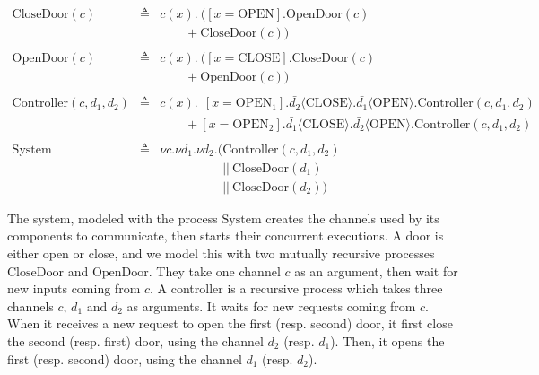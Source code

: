 \begin{example}
  \[
    \begin{array}{rcl}
      \mathrm{CloseDoor}(c)
      & \triangleq
      & c(x) . \ ([x = \mathrm{OPEN}] . \mathrm{OpenDoor}(c) \\
      &
      & \qquad + \mathrm{CloseDoor}(c)) \\
      & & \\
      \mathrm{OpenDoor}(c)
      & \triangleq
      & c(x) . \ ([x = \mathrm{CLOSE}] . \mathrm{CloseDoor}(c) \\
      &
      & \qquad + \mathrm{OpenDoor}(c)) \\
      & & \\
      \mathrm{Controller}(c, d_1, d_2)
      & \triangleq
      & c(x). \ \ [x = \mathrm{OPEN}_1] . \bar{d_2} \langle
        \mathrm{CLOSE} \rangle . \bar{d_1} \langle \mathrm{OPEN} \rangle . \mathrm{Controller}(c, d_1, d_2) \\
      &
      & \qquad + [x = \mathrm{OPEN}_2] . \bar{d_1} \langle
        \mathrm{CLOSE} \rangle . \bar{d_2} \langle \mathrm{OPEN} \rangle. \mathrm{Controller}(c, d_1, d_2) \\
      & & \\
      \mathrm{System}
      & \triangleq
      & \nu c. \nu d_1. \nu d_2. (\mathrm{Controller}(c, d_1, d_2) \\
      &
      & \quad\qquad\qquad ||\ \mathrm{CloseDoor}(d_1) \\
      &
      & \quad\qquad\qquad ||\ \mathrm{CloseDoor}(d_2))
    \end{array}
  \]

  The system, modeled with the process \( \mathrm{System} \) creates the
  channels used by its components to communicate, then starts their concurrent
  executions.
  A door is either open or close, and we model this with two mutually recursive
  processes \( \mathrm{CloseDoor} \) and \( \mathrm{OpenDoor} \).
  They take one channel \( c \) as an argument, then wait for new inputs coming
  from \( c \).
  A controller is a recursive process which takes three channels \( c \),
  \( d_1 \) and \( d_2 \) as arguments.
  It waits for new requests coming from \( c \).
  When it receives a new request to open the first (resp. second) door, it first
  close the second (resp. first) door, using the channel \( d_2 \) (resp.
  \( d_1 \)).
  Then, it opens the first (resp. second) door, using the channel \( d_1 \)
  (resp. \( d_2 \)).
\end{example}

